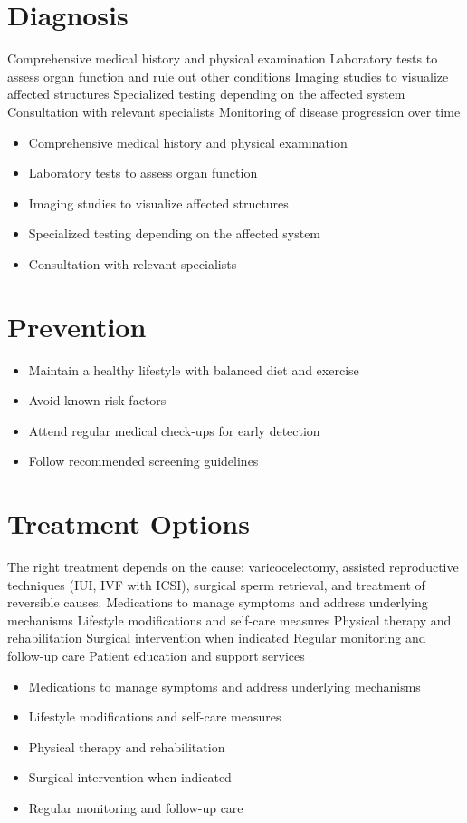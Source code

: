 \section{Diagnosis}
Comprehensive medical history and physical examination Laboratory tests to assess organ function and rule out other conditions Imaging studies to visualize affected structures Specialized testing depending on the affected system Consultation with relevant specialists Monitoring of disease progression over time

\begin{itemize}[noitemsep]
  \item Comprehensive medical history and physical examination
  \item Laboratory tests to assess organ function
  \item Imaging studies to visualize affected structures
  \item Specialized testing depending on the affected system
  \item Consultation with relevant specialists
\end{itemize}
\section{Prevention}
\begin{itemize}[noitemsep]
  \item Maintain a healthy lifestyle with balanced diet and exercise
  \item Avoid known risk factors
  \item Attend regular medical check-ups for early detection
  \item Follow recommended screening guidelines
\end{itemize}
\section{Treatment Options}
The right treatment depends on the cause: varicocelectomy, assisted reproductive techniques (IUI, IVF with ICSI), surgical sperm retrieval, and treatment of reversible causes. Medications to manage symptoms and address underlying mechanisms Lifestyle modifications and self-care measures Physical therapy and rehabilitation Surgical intervention when indicated Regular monitoring and follow-up care Patient education and support services

\begin{itemize}[noitemsep]
  \item Medications to manage symptoms and address underlying mechanisms
  \item Lifestyle modifications and self-care measures
  \item Physical therapy and rehabilitation
  \item Surgical intervention when indicated
  \item Regular monitoring and follow-up care
\end{itemize}
